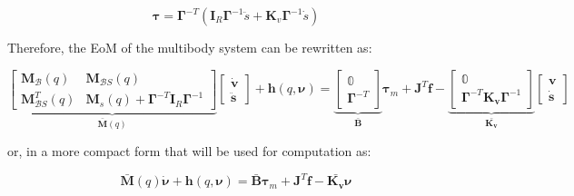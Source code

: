 \begin{equation}
    \label{eqn:mot_dyn_jointspace}
    \boldsymbol{\tau} = \boldsymbol{\Gamma} ^{-T} (\mathbf{I} _R\boldsymbol{\Gamma} ^{-1} \ddot{s} + \mathbf{K}_v \boldsymbol{\Gamma} ^{-1}\dot{s})
\end{equation}

Therefore, the \ac{EoM} of the multibody system can be rewritten as:

\begin{equation}
    \underbrace{\begin{bmatrix}
            \mathbf{M} _{\mathcal{B}}(q)     & \mathbf{M} _{\mathcal{B}S}(q)                                                      \\
            \mathbf{M} _{\mathcal{B}S} ^T(q) & \mathbf{M} _s(q) + \boldsymbol{\Gamma} ^{-T}\mathbf{I} _R\boldsymbol{\Gamma} ^{-1}
        \end{bmatrix}} _{\mathbf{\bar{M}}(q)}
    \begin{bmatrix}
        \dot{\mathrm{\mathbf{v}}} \\
        \ddot{\mathbf{s}}
    \end{bmatrix}+
    \mathbf{h}
    (q,\boldsymbol{\nu}) =
    \underbrace{\begin{bmatrix}
            \mathbb{0} \\
            \boldsymbol{\Gamma} ^{-T}
        \end{bmatrix}} _{\mathbf{\bar{B}}}
    \boldsymbol{\tau} _m
    +
    \mathbf{J} ^T
    \mathbf{f}
    -
    \underbrace{\begin{bmatrix}
            \mathbb{0} \\
            \boldsymbol{\Gamma} ^{-T}\mathbf{K _v}\boldsymbol{\Gamma} ^{-1}
        \end{bmatrix}} _\mathbf{\bar{K _v}}
    \begin{bmatrix}
        \mathrm{\mathbf{v}} \\
        \dot{\mathbf{s}}
    \end{bmatrix}
\end{equation}

or, in a more compact form that will be used for computation as:

\begin{equation}
    \mathbf{\bar{M}}(q)\dot{\boldsymbol{\nu}} + \mathbf{h}(q,\boldsymbol{\nu}) = \mathbf{\bar{B}}\boldsymbol{\tau} _m + \mathbf{J} ^T \mathbf{f} - \bar{\mathbf{K _v}}\boldsymbol{\nu}
\end{equation}

